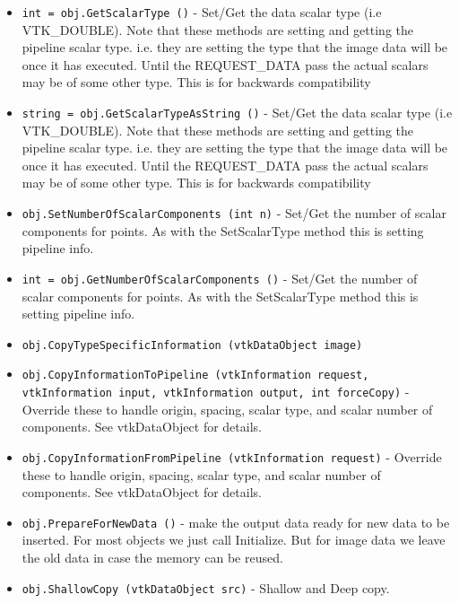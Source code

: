\begin{itemize}
\item  \verb|int = obj.GetScalarType ()| -  Set/Get the data scalar type (i.e VTK\_DOUBLE). Note that these methods
 are setting and getting the pipeline scalar type. i.e. they are setting
 the type that the image data will be once it has executed. Until the
 REQUEST\_DATA pass the actual scalars may be of some other type. This is
 for backwards compatibility

\item  \verb|string = obj.GetScalarTypeAsString ()| -  Set/Get the data scalar type (i.e VTK\_DOUBLE). Note that these methods
 are setting and getting the pipeline scalar type. i.e. they are setting
 the type that the image data will be once it has executed. Until the
 REQUEST\_DATA pass the actual scalars may be of some other type. This is
 for backwards compatibility

\item  \verb|obj.SetNumberOfScalarComponents (int n)| -  Set/Get the number of scalar components for points. As with the
 SetScalarType method this is setting pipeline info.

\item  \verb|int = obj.GetNumberOfScalarComponents ()| -  Set/Get the number of scalar components for points. As with the
 SetScalarType method this is setting pipeline info.

\item  \verb|obj.CopyTypeSpecificInformation (vtkDataObject image)|

\item  \verb|obj.CopyInformationToPipeline (vtkInformation request, vtkInformation input, vtkInformation output, int forceCopy)| -  Override these to handle origin, spacing, scalar type, and scalar
 number of components.  See vtkDataObject for details.

\item  \verb|obj.CopyInformationFromPipeline (vtkInformation request)| -  Override these to handle origin, spacing, scalar type, and scalar
 number of components.  See vtkDataObject for details.

\item  \verb|obj.PrepareForNewData ()| -  make the output data ready for new data to be inserted. For most
 objects we just call Initialize. But for image data we leave the old
 data in case the memory can be reused.

\item  \verb|obj.ShallowCopy (vtkDataObject src)| -  Shallow and Deep copy.


\end{itemize}
